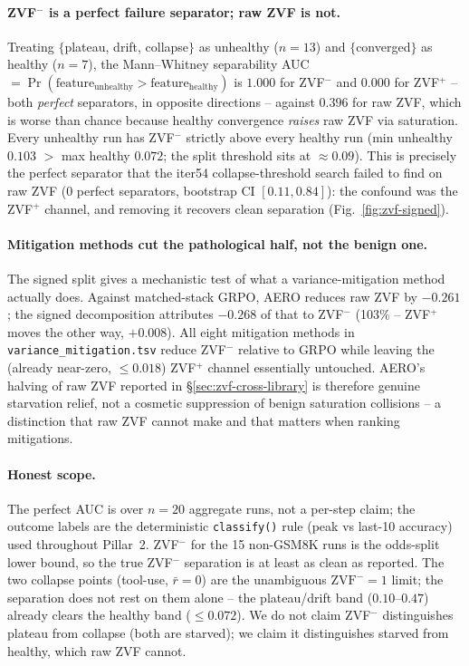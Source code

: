 \documentclass{article}
\begin{document}
\paragraph{ZVF$^-$ is a perfect failure separator; raw ZVF is not.}
Treating $\{$plateau, drift, collapse$\}$ as unhealthy ($n{=}13$) and
$\{$converged$\}$ as healthy ($n{=}7$), the Mann--Whitney separability
AUC $=\Pr(\text{feature}_{\text{unhealthy}}{>}\text{feature}_{\text{healthy}})$
is $1.000$ for ZVF$^-$ and $0.000$ for ZVF$^+$ -- both \emph{perfect}
separators, in opposite directions -- against $0.396$ for raw ZVF, which
is worse than chance because healthy convergence \emph{raises} raw ZVF via
saturation. Every unhealthy run has ZVF$^-$ strictly above every healthy
run (min unhealthy $0.103$ $>$ max healthy $0.072$; the split threshold
sits at $\approx 0.09$). This is precisely the perfect separator that the
iter54 collapse-threshold search failed to find on raw ZVF (0 perfect
separators, bootstrap CI $[0.11,0.84]$): the confound was the ZVF$^+$
channel, and removing it recovers clean separation
(Fig.~\ref{fig:zvf-signed}).

\paragraph{Mitigation methods cut the pathological half, not the benign one.}
The signed split gives a mechanistic test of what a variance-mitigation
method actually does. Against matched-stack GRPO, AERO reduces raw ZVF by
$-0.261$; the signed decomposition attributes $-0.268$ of that to ZVF$^-$
(103\% -- ZVF$^+$ moves the other way, $+0.008$). All eight mitigation
methods in \texttt{variance\_mitigation.tsv} reduce ZVF$^-$ relative to
GRPO while leaving the (already near-zero, $\le 0.018$) ZVF$^+$ channel
essentially untouched. AERO's halving of raw ZVF reported in
\S\ref{sec:zvf-cross-library} is therefore genuine starvation relief, not
a cosmetic suppression of benign saturation collisions -- a distinction
that raw ZVF cannot make and that matters when ranking mitigations.

\paragraph{Honest scope.}
The perfect AUC is over $n{=}20$ aggregate runs, not a per-step claim; the
outcome labels are the deterministic \texttt{classify()} rule (peak vs
last-10 accuracy) used throughout Pillar~2. ZVF$^-$ for the 15 non-GSM8K
runs is the odds-split lower bound, so the true ZVF$^-$ separation is at
least as clean as reported. The two collapse points (tool-use, $\bar
r{=}0$) are the unambiguous $\mathrm{ZVF}^-{=}1$ limit; the separation
does not rest on them alone -- the plateau/drift band ($0.10$--$0.47$)
already clears the healthy band ($\le 0.072$). We do not claim ZVF$^-$
distinguishes plateau from collapse (both are starved); we claim it
distinguishes starved from healthy, which raw ZVF cannot.
\end{document}
